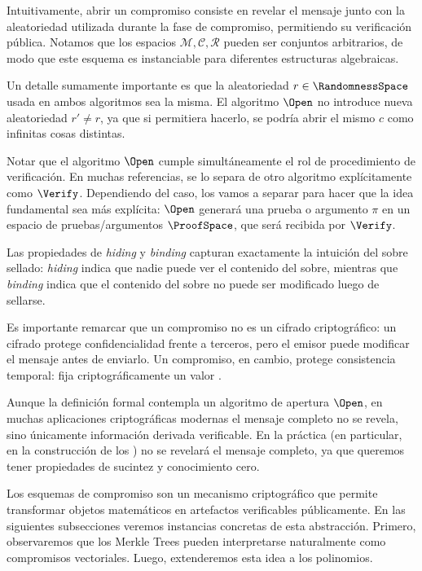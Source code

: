 Intuitivamente, abrir un compromiso consiste en revelar el mensaje junto con la aleatoriedad utilizada durante la fase de compromiso, permitiendo su verificación pública. Notamos que los espacios $\mathcal{M, C, R}$ pueden ser conjuntos arbitrarios, de modo que este esquema es instanciable para diferentes estructuras algebraicas.

Un detalle sumamente importante es que la aleatoriedad $r \in \RandomnessSpace$ usada en ambos algoritmos sea la misma. El algoritmo $\Open$ no introduce nueva aleatoriedad $r' \neq r$, ya que si permitiera hacerlo, se podría abrir el mismo $c$ como infinitas cosas distintas.

Notar que el algoritmo $\Open$ cumple simultáneamente el rol de procedimiento de verificación. En muchas referencias, se lo separa de otro algoritmo explícitamente como $\Verify$. Dependiendo del caso, los vamos a separar para hacer que la idea fundamental sea más explícita: $\Open$ generará una prueba o argumento $\pi$ en un espacio de pruebas/argumentos $\ProofSpace$, que será recibida por $\Verify$.

Las propiedades de \textit{hiding} y \textit{binding} capturan exactamente la intuición del sobre sellado: \textit{hiding} indica que nadie puede ver el contenido del sobre, mientras que \textit{binding} indica que el contenido del sobre no puede ser modificado luego de sellarse.

Es importante remarcar que un compromiso no es un cifrado criptográfico: un cifrado protege confidencialidad frente a terceros, pero el emisor puede modificar el mensaje antes de enviarlo. Un compromiso, en cambio, protege consistencia temporal: fija criptográficamente un valor \cite{katz}.

Aunque la definición formal contempla un algoritmo de apertura $\Open$, en muchas aplicaciones criptográficas modernas el mensaje completo no se revela, sino únicamente información derivada verificable. En la práctica (en particular, en la construcción de los \SNARK) no se revelará el mensaje completo, ya que queremos tener propiedades de sucintez y conocimiento cero.

Los esquemas de compromiso son un mecanismo criptográfico que permite transformar objetos matemáticos en artefactos verificables públicamente. En las siguientes subsecciones veremos instancias concretas de esta abstracción. Primero, observaremos que los Merkle Trees pueden interpretarse naturalmente como compromisos vectoriales. Luego, extenderemos esta idea a los polinomios.

